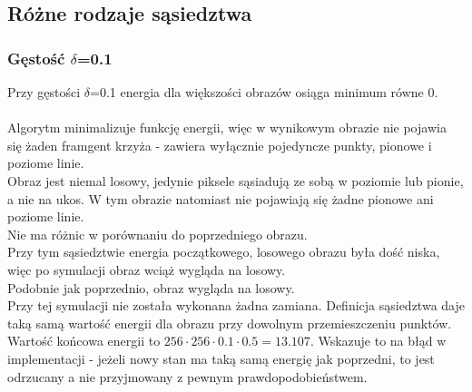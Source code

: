 \subsection{Różne rodzaje sąsiedztwa}
\subsubsection{Gęstość $\delta$=0.1}
Przy gęstości $\delta$=0.1 energia dla większości obrazów osiąga minimum równe 0.\\
\\
Algorytm minimalizuje funkcję energii, więc w wynikowym obrazie nie pojawia się żaden framgent krzyża - zawiera wyłącznie pojedyncze punkty, pionowe i poziome linie.\\
Obraz jest niemal losowy, jedynie piksele sąsiadują ze sobą w poziomie lub pionie, a nie na ukos.
W tym obrazie natomiast nie pojawiają się żadne pionowe ani poziome linie.\\
Nie ma różnic w porównaniu do poprzedniego obrazu.\\
Przy tym sąsiedztwie energia początkowego, losowego obrazu była dość niska, więc po symulacji obraz wciąż wygląda na losowy.\\
Podobnie jak poprzednio, obraz wygląda na losowy.\\
Przy tej symulacji nie została wykonana żadna zamiana. Definicja sąsiedztwa daje taką samą wartość energii dla obrazu przy dowolnym przemieszczeniu punktów. Wartość końcowa energii to $256\cdot 256\cdot 0.1\cdot 0.5 = 13.107$. Wskazuje to na błąd w implementacji - jeżeli nowy stan ma taką samą energię jak poprzedni, to jest odrzucany a nie przyjmowany z pewnym prawdopodobieństwem.\\
